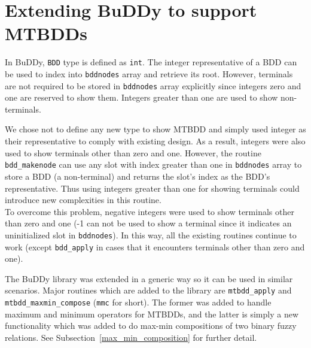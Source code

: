\documentclass[4pt]{article}
\begin{document}
\section{Extending BuDDy to support MTBDDs}
\label{extend_buddy_sec}
In BuDDy, \verb=BDD= type is defined as \verb=int=. The integer representative of a BDD can be used to index into \verb=bddnodes= array and retrieve its root. However, terminals are not required to be stored in \verb=bddnodes= array explicitly since integers zero and one are reserved to show them. Integers greater than one are used to show non-terminals. 

We chose not to define any new type to show MTBDD and simply used integer as their representative to comply with existing design. As a result, integers were also used to show terminals other than zero and one. However, the routine \verb=bdd_makenode= can use any slot with index greater than one in \verb=bddnodes= array to store a BDD (a non-terminal) and returns the slot's index as the BDD's representative. Thus using integers greater than one for showing terminals could introduce new complexities in this routine.\\
To overcome this problem, negative integers were used to show terminals other than zero and one (-1 can not be used to show a terminal since it indicates an uninitialized slot in \verb=bddnodes=). In this way, all the existing routines continue to work (except \verb=bdd_apply= in cases that it encounters terminals other than zero and one).

The BuDDy library was extended in a generic way so it can be used in similar scenarios. Major routines which are added to the library are \verb=mtbdd_apply= and \verb=mtbdd_maxmin_compose= (\verb=mmc= for short). The former was added to handle maximum and minimum operators for MTBDDs, and the latter is simply a new functionality which was added to do max-min compositions of two binary fuzzy relations. See Subsection~\ref{max_min_composition} for further detail.
\end{document}
